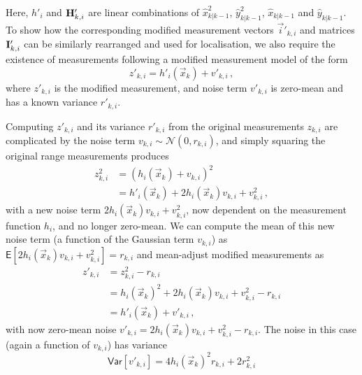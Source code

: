 Here, $h'_i$ and ${{\mathbf{H}}}'_{k,i}$ are linear combinations of $\hat{x}_{k|k-1}^2$, $\hat{y}_{k|k-1}^2$, $\hat{x}_{k|k-1}$ and $\hat{y}_{k|k-1}$. To show how the corresponding modified measurement vectors $\vec{i}'_{k,i}$ and matrices ${{\mathbf{I}}}'_{k,i}$ can be similarly rearranged and used for localisation, we also require the existence of measurements following a modified measurement model of the form
\begin{equation}
    z'_{k,i} = h'_i(\vec{x}_k)+v'_{k,i}\,, \label{eqn:modified_measurement_model}
\end{equation}
where $z'_{k,i}$ is the modified measurement, and noise term $v'_{k,i}$ is zero-mean and has a known variance $r'_{k,i}$.

Computing $z'_{k,i}$ and its variance $r'_{k,i}$ from the original measurements $z_{k,i}$ are complicated by the noise term $v_{k,i} \sim \mathcal{N}(0, r_{k,i})$, and simply squaring the original range measurements produces
\begin{equation}
    \begin{split}
        z_{k,i}^2 &= (h_i(\vec{x}_k) + v_{k,i})^2 \\
        &= h'_i(\vec{x}_k) + 2h_i(\vec{x}_k)v_{k,i} + v_{k,i}^2\,,
    \end{split}
\end{equation}
with a new noise term $2h_i(\vec{x}_k)v_{k,i} + v_{k,i}^2$, now dependent on the measurement function $h_i$, and no longer zero-mean. We can compute the mean of this new noise term (a function of the Gaussian term $v_{k,i}$) as $\mathsf{E}[2h_i(\vec{x}_k)v_{k,i} + v_{k,i}^2] = r_{k,i}$ and mean-adjust modified measurements as
\begin{equation}
    \begin{split}
        z'_{k,i} &= z_{k,i}^2 - r_{k,i} \\
        &= h_i(\vec{x}_k)^2 + 2h_i(\vec{x}_k)v_{k,i} + v_{k,i}^2 - r_{k,i} \\
        &= h'_i(\vec{x}_k) + v'_{k,i}\,,
    \end{split} \label{eqn:modified_measurement}
\end{equation}
with now zero-mean noise $v'_{k,i} = 2h_i(\vec{x}_k)v_{k,i} + v_{k,i}^2 - r_{k,i}$. The noise in this case (again a function of $v_{k,i}$) has variance 
\begin{equation}
    \mathsf{Var}[v'_{k,i}] = 4h_i(\vec{x}_k)^2r_{k,i} + 2r_{k,i}^2 \label{eqn:modified_measurement_variance}
\end{equation}
